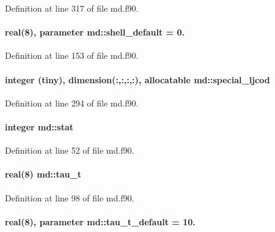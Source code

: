 Definition at line 317 of file md.\-f90.

\hypertarget{classmd_ac5881b079c82e5b0859142a83ee22b37}{
\paragraph[{shell\-\_\-default}]{\setlength{\rightskip}{0pt plus 5cm}real(8), parameter md\-::shell\-\_\-default = 0.}}\label{classmd_ac5881b079c82e5b0859142a83ee22b37}


Definition at line 153 of file md.\-f90.

\hypertarget{classmd_a7bc57570fb5b99d046c51d067c6aeb09}{
\paragraph[{special\-\_\-ljcod}]{\setlength{\rightskip}{0pt plus 5cm}integer (tiny), dimension(\-:,\-:,\-:,\-:), allocatable md\-::special\-\_\-ljcod}}\label{classmd_a7bc57570fb5b99d046c51d067c6aeb09}


Definition at line 294 of file md.\-f90.

\hypertarget{classmd_a6e1f91a2c93479a46931a0792edd2992}{
\paragraph[{stat}]{\setlength{\rightskip}{0pt plus 5cm}integer md\-::stat}}\label{classmd_a6e1f91a2c93479a46931a0792edd2992}


Definition at line 52 of file md.\-f90.

\hypertarget{classmd_a1eecc6d7fec8a7908e06a194890e873c}{
\paragraph[{tau\-\_\-t}]{\setlength{\rightskip}{0pt plus 5cm}real(8) md\-::tau\-\_\-t}}\label{classmd_a1eecc6d7fec8a7908e06a194890e873c}


Definition at line 98 of file md.\-f90.

\hypertarget{classmd_abbe077dab38ac32d051ad4fb08428f1c}{
\paragraph[{tau\-\_\-t\-\_\-default}]{\setlength{\rightskip}{0pt plus 5cm}real(8), parameter md\-::tau\-\_\-t\-\_\-default = 10.}}\label{classmd_abbe077dab38ac32d051ad4fb08428f1c}


